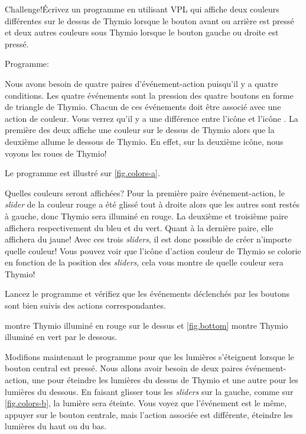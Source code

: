 

\begin{bclogo}[couleur = pink!30, arrondi = 0.1, logo = \bccrayon, ombre = true]{Challenge!}Écrivez un programme en utilisant VPL qui affiche deux couleurs différentes sur le dessus de Thymio lorsque le bouton avant ou arrière est pressé et deux autres couleurs sous Thymio lorsque le bouton gauche ou droite est pressé.
\end{bclogo}

{\raggedleft \hfill Programme: }

Nous avons besoin de quatre paires d'événement-action puisqu'il y a quatre conditions. Les quatre événements sont la pression des quatre boutons en forme de triangle de Thymio. Chacun de ces événements doit être associé avec une action de couleur. Vous verrez qu'il y a une différence entre l'icône  et l'icône . La première des deux affiche une couleur sur le dessus de Thymio alors que la deuxième allume le dessous de Thymio. En effet, sur la deuxième icône, nous voyons les roues de Thymio!

Le programme est illustré sur \cref{fig.colors-a}.

Quelles couleurs seront affichées? Pour la première paire événement-action, le \textit{slider} de la couleur rouge a été glissé tout à droite alors que les autres sont restés à gauche, donc Thymio sera illuminé en rouge. La deuxième et troisième paire affichera respectivement du bleu et du vert. Quant à la dernière paire, elle affichera du jaune! Avec ces trois \textit{sliders}, il est donc possible de créer n'importe quelle couleur!  Vous pouvez voir que l'icône d'action couleur de Thymio se colorie en fonction de la position des \textit{sliders}, cela vous montre de quelle couleur sera Thymio!

Lancez le programme et vérifiez que les événements déclenchés par les boutons sont bien suivis des actions correspondantes.

 montre Thymio illuminé en rouge sur le dessus et \cref{fig.bottom} montre Thymio illuminé en vert par le dessous.


Modifions maintenant le programme pour que les lumières s'éteignent lorsque le bouton central est pressé. Nous allons avoir besoin de deux paires événement-action, une pour éteindre les lumières du dessus de Thymio et une autre pour les lumières du dessous. En faisant glisser tous les \textit{sliders} sur la gauche, comme sur \cref{fig.colors-b}, la lumière sera éteinte. Vous voyez que l'événement est le même, appuyer sur le bouton centrale, mais l'action associée est différente, éteindre les lumières du haut ou du bas.

